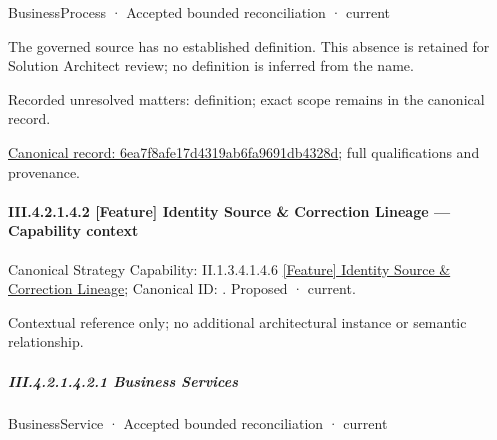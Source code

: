 \label{navigation:III.4.2.1.4.1.2.1}

\label{element:6ea7f8afe17d4319ab6fa9691db4328d}
{\small BusinessProcess · Accepted bounded reconciliation · current}\par

The governed source has no established definition. This absence is retained for Solution Architect review; no definition is inferred from the name.


{\small Recorded unresolved matters: definition; exact scope remains in the canonical record.}\par
{\footnotesize \href{../../../../../../../continuum/business/business-process/6ea7f8afe17d4319ab6fa9691db4328d.md}{Canonical record: 6ea7f8afe17d4319ab6fa9691db4328d}; full qualifications and provenance.}\par
\paragraph*{III.4.2.1.4.2 [Feature] Identity Source \& Correction Lineage — Capability context}
\label{navigation:III.4.2.1.4.2}

{\small Canonical Strategy Capability: II.1.3.4.1.4.6 \hyperref[element:d72134e75001449a9e7ffae53f61458f]{[Feature] Identity Source \& Correction Lineage}; Canonical ID: \texttt{}. Proposed · current.}\par
Contextual reference only; no additional architectural instance or semantic relationship.\par
\subparagraph*{III.4.2.1.4.2.1 Business Services}
\label{navigation:III.4.2.1.4.2.1}

\label{navigation:III.4.2.1.4.2.1.1}

\label{element:b95f652107f4420b86cc10fb893c9b01}
{\small BusinessService · Accepted bounded reconciliation · current}\par

